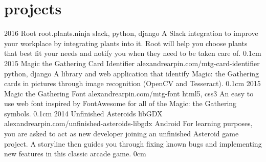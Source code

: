 \documentclass[]{friggeri-cv}
\begin{document}
\section{projects}

\begin{entrylist}
 \entry
    {2016}
    {Root {\normalfont root.plants.ninja}}
    {slack, python, django}
    {A Slack integration to improve your workplace by integrating plants into it. Root will help you choose plants that best fit your needs and notify you when they need to be taken care of.}
    {0.1cm}
 \entry
    {2015}
    {Magic the Gathering Card Identifier {\normalfont alexandrearpin.com/mtg-card-identifier}}
    {python, django}
    {A library and web application that identify Magic: the Gathering cards in pictures through image recognition (OpenCV and Tesseract).}
    {0.1cm}
  \entry
    {2015}
    {Magic the Gathering Font {\normalfont alexandrearpin.com/mtg-font}}
    {html5, css3}
    {An easy to use web font inspired by FontAwesome for all of the Magic: the Gathering symbols.}
    {0.1cm}
  \entry
    {2014}
    {Unfinished Asteroids libGDX {\normalfont alexandrearpin.com/unfinished-asteroids-libgdx}}
    {Android}
    {For learning purposes, you are asked to act as new developer joining an unfinished Asteroid game project. A storyline then guides you through fixing known bugs and implementing new features in this classic arcade game.}
    {0cm}
\end{entrylist}
\end{document}
